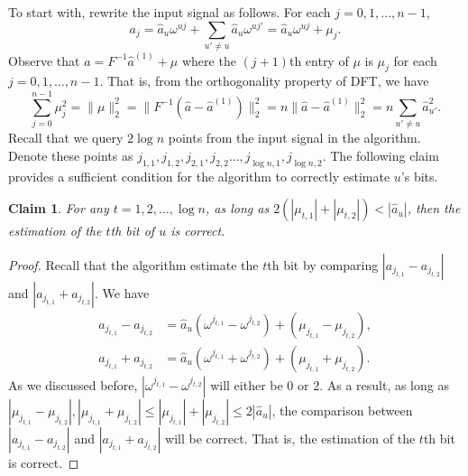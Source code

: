 \documentclass[11pt]{article}
\newtheorem{claim}[theorem]{Claim}
\begin{document}
To start with, rewrite the input signal as follows. For each $j=0,1,\dots,n-1$,
\begin{equation}
a_j = \hat{a}_u\omega^{uj} + \sum_{u'\neq u}\hat{a}_u\omega^{uj'}=\hat{a}_u\omega^{uj}+\mu_j.
\end{equation}
Observe that $a=F^{-1}\hat{a}^{(1)}+\mu$ where the $(j+1)$th entry of $\mu$ is $\mu_j$ for each $j=0,1,\dots,n-1$. That is, from the orthogonality property of DFT, we have
\begin{equation}
\sum_{j=0}^{n-1}\mu_j^2=\|\mu\|_2^2 = \|F^{-1}(\hat{a}-\hat{a}^{(1)})\|_2^2 = n\|\hat{a}-\hat{a}^{(1)}\|_2^2 = n\sum_{u'\neq u}\hat{a}_{u'}^2.
\end{equation}
Recall that we query $2\log n$ points from the input signal in the algorithm. Denote these points as $j_{1,1},j_{1,2},j_{2,1},j_{2,2}\dots,j_{\log n,1},j_{\log n,2}$. The following claim provides a sufficient condition for the algorithm to correctly estimate $u$'s bits.
\begin{claim}\label{claim:noisy}
	For any $t=1,2,\dots,\log n$, as long as $2(|\mu_{t,1}|+|\mu_{t,2}|)<|\hat{a}_u|$, then the estimation of the $t$th bit of $u$ is correct.
\end{claim}
\begin{proof}
	Recall that the algorithm estimate the $t$th bit by comparing $|a_{j_{t,1}}-a_{j_{t,2}}|$ and $|a_{j_{t,1}}+a_{j_{t,2}}|$. We have
	\begin{align*}
	a_{j_{t,1}}-a_{j_{t,2}} &= \hat{a}_u(\omega^{j_{t,1}}-\omega^{j_{t,2}}) + (\mu_{j_{t,1}} - \mu_{j_{t,2}}),\\
	a_{j_{t,1}}+a_{j_{t,2}} &= \hat{a}_u(\omega^{j_{t,1}}+\omega^{j_{t,2}}) + (\mu_{j_{t,1}} + \mu_{j_{t,2}}).
	\end{align*}
	As we discussed before, $|\omega^{j_{t,1}}-\omega^{j_{t,2}}|$ will either be $0$ or $2$. As a result, as long as $|\mu_{j_{t,1}} - \mu_{j_{t,2}}|,|\mu_{j_{t,1}} + \mu_{j_{t,2}}|\leq|\mu_{j_{t,1}}| + |\mu_{j_{t,2}}|\leq2|\hat{a}_u|$, the comparison between $|a_{j_{t,1}}-a_{j_{t,2}}|$ and $|a_{j_{t,1}}+a_{j_{t,2}}|$ will be correct. That is, the estimation of the $t$th bit is correct.
\end{proof}
\end{document}
